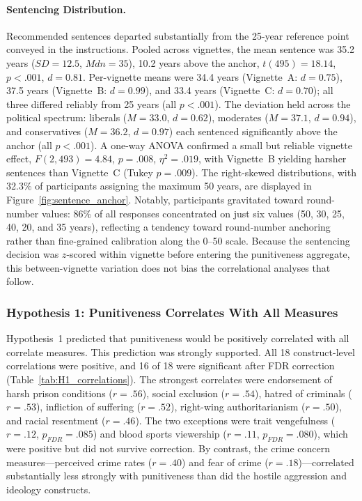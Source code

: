 \paragraph{Sentencing Distribution.} Recommended sentences departed substantially from the 25-year reference point conveyed in the instructions. Pooled across vignettes, the mean sentence was 35.2 years ($SD = 12.5$, $\mathit{Mdn} = 35$), 10.2 years above the anchor, $t(495) = 18.14$, $p < .001$, $d = 0.81$. Per-vignette means were 34.4 years (Vignette~A: $d = 0.75$), 37.5 years (Vignette~B: $d = 0.99$), and 33.4 years (Vignette~C: $d = 0.70$); all three differed reliably from 25 years (all $p < .001$). The deviation held across the political spectrum: liberals ($M = 33.0$, $d = 0.62$), moderates ($M = 37.1$, $d = 0.94$), and conservatives ($M = 36.2$, $d = 0.97$) each sentenced significantly above the anchor (all $p < .001$). A one-way ANOVA confirmed a small but reliable vignette effect, $F(2, 493) = 4.84$, $p = .008$, $\eta^2 = .019$, with Vignette~B yielding harsher sentences than Vignette~C (Tukey $p = .009$). The right-skewed distributions, with 32.3\% of participants assigning the maximum 50 years, are displayed in Figure~\ref{fig:sentence_anchor}. Notably, participants gravitated toward round-number values: 86\% of all responses concentrated on just six values (50, 30, 25, 40, 20, and 35 years), reflecting a tendency toward round-number anchoring rather than fine-grained calibration along the 0--50 scale. Because the sentencing decision was $z$-scored within vignette before entering the punitiveness aggregate, this between-vignette variation does not bias the correlational analyses that follow.

\subsubsection{Hypothesis 1: Punitiveness Correlates With All Measures}

Hypothesis~1 predicted that punitiveness would be positively correlated with all correlate measures. This prediction was strongly supported. All 18 construct-level correlations were positive, and 16 of 18 were significant after FDR correction (Table~\ref{tab:H1_correlations}). The strongest correlates were endorsement of harsh prison conditions ($r = .56$), social exclusion ($r = .54$), hatred of criminals ($r = .53$), infliction of suffering ($r = .52$), right-wing authoritarianism ($r = .50$), and racial resentment ($r = .46$). The two exceptions were trait vengefulness ($r = .12$, $p_\textit{FDR} = .085$) and blood sports viewership ($r = .11$, $p_\textit{FDR} = .080$), which were positive but did not survive correction. By contrast, the crime concern measures---perceived crime rates ($r = .40$) and fear of crime ($r = .18$)---correlated substantially less strongly with punitiveness than did the hostile aggression and ideology constructs.

